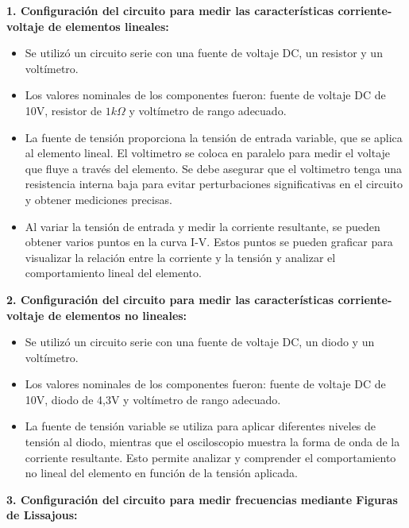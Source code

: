 \documentclass[12pt]{article}
\begin{document}
	\textbf{1. Configuración del circuito para medir las características corriente-voltaje de elementos lineales:}
	
	\begin{itemize}
		\item Se utilizó un circuito serie con una fuente de voltaje DC, un resistor y un voltímetro.
		\item Los valores nominales de los componentes fueron: fuente de voltaje DC de 10V, resistor de $1k\Omega$ y voltímetro de rango adecuado.
		\item La fuente de tensión proporciona la tensión de entrada variable, que se aplica al elemento lineal. El voltimetro se coloca en paralelo para medir el voltaje que fluye a través del elemento. Se debe asegurar que el voltimetro tenga una resistencia interna baja para evitar perturbaciones significativas en el circuito y obtener mediciones precisas.
		\item Al variar la tensión de entrada y medir la corriente resultante, se pueden obtener varios puntos en la curva I-V. Estos puntos se pueden graficar para visualizar la relación entre la corriente y la tensión y analizar el comportamiento lineal del elemento. 
	\end{itemize}
	
	\textbf{2. Configuración del circuito para medir las características corriente-voltaje de elementos no lineales:}
	
	\begin{itemize}
		\item Se utilizó un circuito serie con una fuente de voltaje DC, un diodo y un voltímetro.
		\item Los valores nominales de los componentes fueron: fuente de voltaje DC de 10V, diodo de 4,3V y voltímetro de rango adecuado.
		\item La fuente de tensión variable se utiliza para aplicar diferentes niveles de tensión al diodo, mientras que el osciloscopio muestra la forma de onda de la corriente resultante. Esto permite analizar y comprender el comportamiento no lineal del elemento en función de la tensión aplicada. 
	\end{itemize}
	
	\textbf{3. Configuración del circuito para medir frecuencias mediante Figuras de Lissajous:}
	
\end{document}
